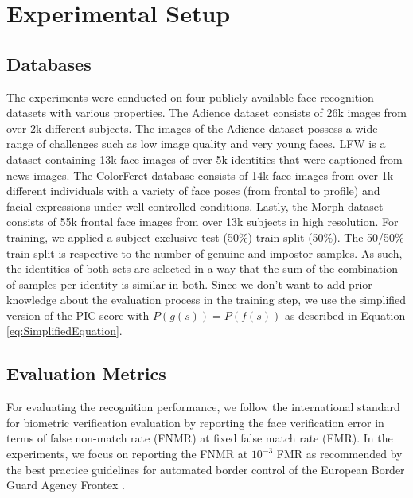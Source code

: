 \documentclass[10pt,twocolumn,letterpaper]{article}
\begin{document}
\section{Experimental Setup} 
\label{sec:ExperimentalSetup}

\subsection{Databases}
The experiments were conducted on four publicly-available face recognition datasets with various properties.
The Adience dataset \cite{Eidinger:2014:AGE:2771306.2772049} consists of 26k images from over 2k different subjects.
The images of the Adience dataset possess a wide range of challenges such as low image quality and very young faces.
LFW is a dataset \cite{LFWTech} containing 13k face images of over 5k identities that were captioned from news images.
The ColorFeret database \cite{DBLP:journals/pami/PhillipsMRR00} consists of 14k face images from over 1k different individuals with a variety of face poses (from frontal to profile) and facial expressions under well-controlled conditions.
Lastly, the Morph \cite{DBLP:conf/fgr/RicanekT06} dataset consists of 55k frontal face images from over 13k subjects in high resolution.
For training, we applied a subject-exclusive test (50\%) train split (50\%). The 50/50\% train split is respective to the number of genuine and impostor samples. As such, the identities of both sets are selected in a way that the sum of the combination of samples per identity is similar in both.
Since we don't want to add prior knowledge about the evaluation process in the training step, we use the simplified version of the PIC score with $P(g(s))=P(f(s))$ as described in Equation \ref{eq:SimplifiedEquation}.



\subsection{Evaluation Metrics}
For evaluating the recognition performance, we follow the international standard for biometric verification evaluation \cite{ISO_Metrik} by reporting the face verification error in terms of false non-match rate (FNMR) at fixed false match rate (FMR).
In the experiments, we focus on reporting the FNMR at $10^{-3}$ FMR as recommended by the best practice guidelines for automated border control of the European Border Guard Agency Frontex \cite{FrontexBestPractice}.
\end{document}
